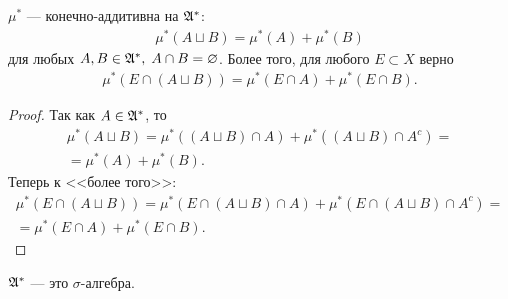 \begin{lm}
 $ \mu^\ast $ --- конечно-аддитивна на $ \mathfrak{A}^\ast $:
 \begin{align*}
  \mu^\ast(A \sqcup B) = \mu^\ast(A) + \mu^\ast(B)
 \end{align*} для любых $ A, B \in \mathfrak{A}^\ast,\; A \cap B = \varnothing $. Более того, для любого $ E \subset X $ верно
 \begin{align*}
  \mu^\ast(E \cap (A \sqcup B)) = \mu^\ast(E \cap A) + \mu^\ast(E \cap B)
 .\end{align*}
\end{lm}
\begin{proof}
 Так как $ A \in \mathfrak{A}^\ast $, то
 \begin{align*}
  \mu^\ast(A \sqcup B) = \mu^\ast((A \sqcup B) \cap A) + \mu^\ast((A \sqcup B) \cap A^c) = \\
  = \mu^\ast(A) + \mu^\ast(B)
 .\end{align*} Теперь к <<более того>>:
 \begin{align*}
  \mu^\ast(E \cap (A \sqcup B)) = \mu^\ast(E \cap (A \sqcup B) \cap A) + \mu^\ast(E \cap (A \sqcup B) \cap A^c) = \\
  = \mu^\ast(E \cap A) + \mu^\ast(E \cap B)
 .\end{align*}
\end{proof}
\begin{lm}
 $ \mathfrak{A}^\ast $ --- это $ \sigma $-алгебра.
\end{lm}
